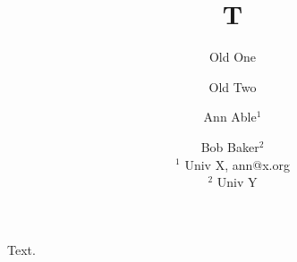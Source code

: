 \documentclass{article}
\begin{document}
\title{T}
\author{Old One \and Old Two}
\author{Ann Able$^1$ \and Bob Baker$^2$ \\ $^1$ Univ X, ann@x.org \\ $^2$ Univ Y}
\maketitle
Text.
\end{document}
